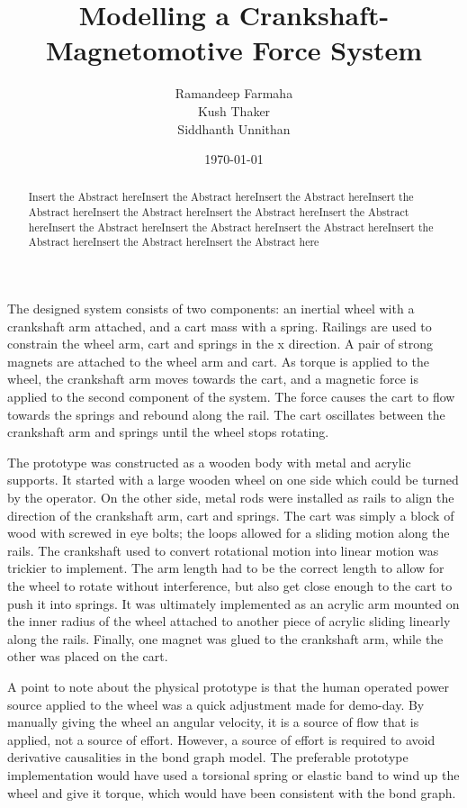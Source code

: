 \documentclass[notitlepage,11pt]{report}
\title{Modelling a Crankshaft-Magnetomotive Force System}
\author{Ramandeep Farmaha \\ Kush Thaker \\ Siddhanth Unnithan}
\date{\today}
\begin{document}
\maketitle
\thispagestyle{empty}

\begin{abstract}
Insert the Abstract hereInsert the Abstract hereInsert the Abstract hereInsert the Abstract hereInsert the Abstract hereInsert the Abstract hereInsert the Abstract hereInsert the Abstract hereInsert the Abstract hereInsert the Abstract hereInsert the Abstract hereInsert the Abstract hereInsert the Abstract here
\end{abstract}
\begin{multicols}{2}
The designed system consists of two components: an inertial wheel with a crankshaft arm attached, and a cart mass with a spring. Railings are used to constrain the wheel arm, cart and springs in the x direction. A pair of strong magnets are attached to the wheel arm and cart. As torque is applied to the wheel, the crankshaft arm moves towards the cart, and a magnetic force is applied to the second component of the system. The force causes the cart to flow towards the springs and rebound along the rail. The cart oscillates between the crankshaft arm and springs until the wheel stops rotating.

The prototype was constructed as a wooden body with metal and acrylic supports. It started with a large wooden wheel on one side which could be turned by the operator. On the other side, metal rods were installed as rails to align the direction of the crankshaft arm, cart and springs. The cart was simply a block of wood with screwed in eye bolts; the loops allowed for a sliding motion along the rails. The crankshaft used to convert rotational motion into linear motion was trickier to implement. The arm length had to be the correct length to allow for the wheel to rotate without interference, but also get close enough to the cart to push it into springs. It was ultimately implemented as an acrylic arm mounted on the inner radius of the wheel attached to another piece of acrylic sliding linearly along the rails. Finally, one magnet was glued to the crankshaft arm, while the other was placed on the cart.

A point to note about the physical prototype is that the human operated power source applied to the wheel was a quick adjustment made for demo-day. By manually giving the wheel an angular velocity, it is a source of flow that is applied, not a source of effort. However, a source of effort is required to avoid derivative causalities in the bond graph model. The preferable prototype implementation would have used a torsional spring or elastic band to wind up the wheel and give it torque, which would have been consistent with the bond graph.


\end{multicols}
\end{document}
